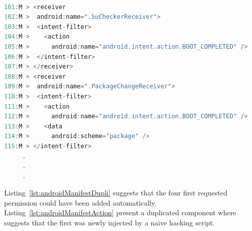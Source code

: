 \begin{lstlisting}[caption={An example of duplicated component capability from malicious version of app (com.koushikdutta.superuser)}, language=Java,
    basicstyle=\fontsize{6}{5}\selectfont\ttfamily,
    label={lst:androidManifestAction}]

101:M > <receiver
102:M >  android:name=".SuCheckerReceiver">
103:M >  <intent-filter>
104:M >    <action
105:M >      android:name="android.intent.action.BOOT_COMPLETED" />                 
106:M >  </intent-filter>
107:M > </receiver>
108:M > <receiver
109:M >  android:name=".PackageChangeReceiver">
110:M >  <intent-filter>
111:M >    <action
112:M >      android:name="android.intent.action.BOOT_COMPLETED" />
113:M >    <data
114:M >      android:scheme="package" />
115:M > </intent-filter>
     .
     .
     .
\end{lstlisting}

Listing~\ref{lst:androidManifestDupli} suggests that the four first requested permission could have been added automatically. Listing~\ref{lst:androidManifestAction} present a duplicated component where suggests that the first was newly injected by a naive hacking script.



